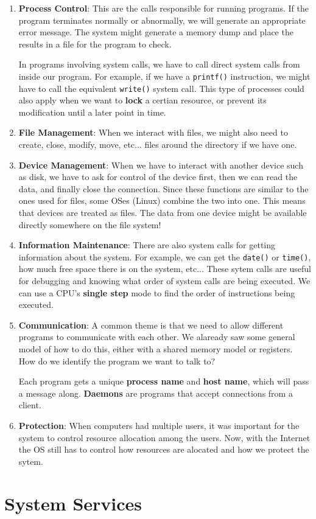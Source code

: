 \documentclass{tufte-handout}
\begin{document}
\begin{enumerate}
	\item \textbf{Process Control}: This are the calls responsible for running 
			programs. If the program terminates normally or abnormally, we will
			generate an appropriate error message. The system might generate a 
			memory dump and place the results in a file for the program to check.

			In programs involving system calls, we have to call direct system calls
			from inside our program. For example, if we have a \texttt{printf()} 
			instruction, we might have to call the equivalent \texttt{write()}
			system call. This type of processes could also apply when we want to 
			\textbf{lock} a certian resource, or prevent its modification until 
			a later point in time.

	\item \textbf{File Management}: When we interact with files, we might also need 
			to create, close, modify, move, etc... files around the directory 
			if we have one.
	\item \textbf{Device Management}: When we have to interact with another device
			such as disk, we have to ask for control of the device first, then
			we can read the data, and finally close the connection. Since these
			functions are similar to the ones used for files, some OSes (Linux) 
			combine the two into one. This means that devices are treated as files.
			The data from one device might be available directly somewhere on the 
			file system!
	\item \textbf{Information Maintenance}: There are also system calls for getting
			information about the system. For example, we can get the \texttt{date()}
			or \texttt{time()}, how much free space there is on the system, etc... 
			These sytem calls are useful for debugging and knowing what order of 
			system calls are being executed. We can use a CPU's \textbf{single step}
			mode to find the order of instructions being executed.
	\item \textbf{Communication}: A common theme is that we need to allow 
			different programs to communicate with each other. We alaready saw some
			general model of how to do this, either with a shared memory model or 
			registers. How do we identify the program we want to talk to?

			Each program gets a unique \textbf{process name} and 
			\textbf{host name}, which will pass a message along. \textbf{Daemons}
			are programs that accept connections from a client.

	\item \textbf{Protection}: When computers had multiple users, it was important
			for the system to control resource allocation among the users. Now, with 
			the Internet the OS still has to control how resources are alocated
			and how we protect the sytem.
\end{enumerate}
\section{System Services}
\end{document}
